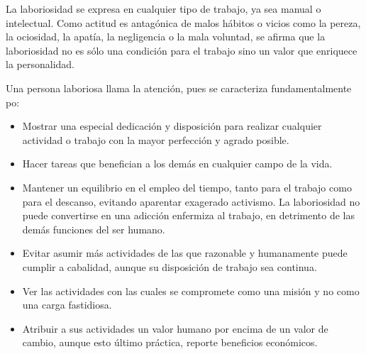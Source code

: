 \documentclass[10pt,twoside]{article}
\begin{document}
La laboriosidad se expresa en cualquier tipo de trabajo, ya sea
manual o intelectual. Como actitud es antagónica de malos hábitos
o vicios como la pereza, la ociosidad, la apatía, la negligencia o la
mala voluntad, se afirma que la laboriosidad no es sólo una condición
para el trabajo sino un valor que enriquece la personalidad.

Una persona laboriosa llama la atención, pues se caracteriza
fundamentalmente po:
\begin{itemize}
\item Mostrar una especial dedicación y disposición para realizar
cualquier actividad o trabajo con la mayor perfección y
agrado posible.
\item Hacer tareas que benefician a los demás en cualquier campo
de la vida.
\item Mantener un equilibrio en el empleo del tiempo,
tanto para el trabajo como para el descanso, evitando
aparentar exagerado activismo. La laboriosidad no
puede convertirse en una adicción enfermiza al trabajo,
en detrimento de las demás funciones del ser humano.
\item Evitar asumir más actividades de las que razonable y
humanamente puede cumplir a cabalidad, aunque su
disposición de trabajo sea continua.
\item Ver las actividades con las cuales se compromete como
una misión y no como una carga fastidiosa.
\item Atribuir a sus actividades un valor humano por encima
de un valor de cambio, aunque esto último
práctica, reporte beneficios económicos.

\end{itemize}
\end{document}
